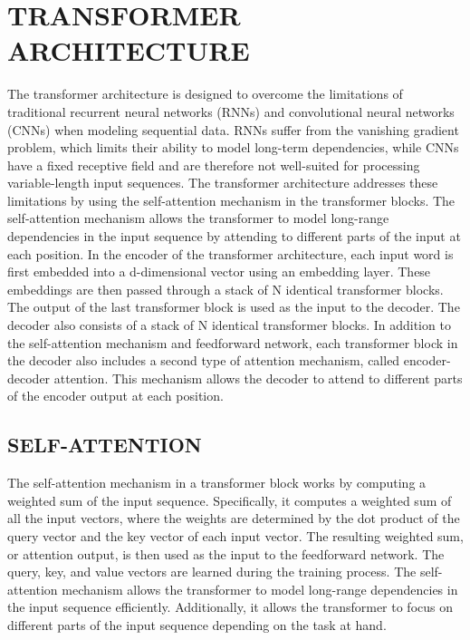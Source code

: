 \documentclass[letterpaper, 10pt, conference]{ieeeconf}
\begin{document}
        \section{TRANSFORMER ARCHITECTURE}

        The transformer architecture is designed to overcome the limitations of traditional recurrent neural networks (RNNs) and
        convolutional neural networks (CNNs) when modeling sequential data. RNNs suffer from the vanishing gradient problem, which
        limits their ability to model long-term dependencies, while CNNs have a fixed receptive field and are therefore not well-suited for
        processing variable-length input sequences.\cite{pascasnu2013}
        The transformer architecture addresses these limitations by using the self-attention mechanism in the transformer blocks.
        The self-attention mechanism allows the transformer to model long-range dependencies in the input sequence by attending to
        different parts of the input at each position.
        In the encoder of the transformer architecture, each input word is first embedded into a d-dimensional vector using an
        embedding layer. These embeddings are then passed through a stack of N identical transformer blocks. The output of the last
        transformer block is used as the input to the decoder.
        The decoder also consists of a stack of N identical transformer blocks. In addition to the self-attention mechanism and
        feedforward network, each transformer block in the decoder also includes a second type of attention mechanism, called encoder-decoder attention. This mechanism allows the decoder to attend to different parts of the encoder output at each position.\cite{vaswani2017}
           
    
        
        \subsection{SELF-ATTENTION} 
        
        The self-attention mechanism in a transformer block works by computing a weighted sum of the input sequence. Specifically, it
        computes a weighted sum of all the input vectors, where the weights are determined by the dot product of the query vector and the
        key vector of each input vector.
        The resulting weighted sum, or attention output, is then used as the input to the feedforward network. The query, key,
        and value vectors are learned during the training process.
        The self-attention mechanism allows the transformer to model long-range dependencies in the input sequence efficiently.
        Additionally, it allows the transformer to focus on different parts of the input sequence depending on the task at hand.\cite{vaswani2017}
        
\end{document}
